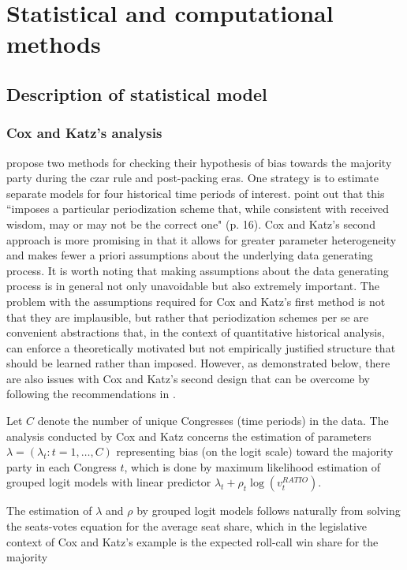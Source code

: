 \section{Statistical and computational methods}
\subsection{Description of statistical model}
\label{subsection_methods}

\subsubsection{Cox and Katz's analysis}

 propose two methods for checking their hypothesis of bias towards the majority party during the czar rule and post-packing eras. One strategy is to estimate separate models for four historical time periods of interest.  point out that this ``imposes a particular periodization scheme that, while consistent with received wisdom, may or may not be the correct one" (p. 16). Cox and Katz's second approach is more promising in that it allows for greater parameter heterogeneity and makes fewer a priori assumptions about the underlying data generating process. It is worth noting that making assumptions about the data generating process is in general not only unavoidable but also extremely important. The problem with the assumptions required for Cox and Katz's first method is not that they are implausible, but rather that periodization schemes per se are convenient abstractions that, in the context of quantitative historical analysis, can enforce a theoretically motivated but not empirically justified structure that should be learned rather than imposed. However, as demonstrated below, there are also issues with Cox and Katz's second design that can be overcome by following the recommendations in . 

Let $C$ denote the number of unique Congresses (time periods) in the data. The analysis conducted by Cox and Katz concerns the estimation of parameters  $\lambda = (\lambda_t : t = 1, \dots, C)$ representing bias (on the logit scale) toward the majority party in each Congress $t$, which is done by maximum likelihood estimation of grouped logit models with linear predictor $ \lambda_t + \rho_t \log{\left(v_t^{RATIO} \right)}$. 

The estimation of $\lambda$ and $\rho$ by grouped logit models follows naturally from solving the seats-votes equation for the average seat share, which in the legislative context of Cox and Katz's example is the expected roll-call win share for the majority 

